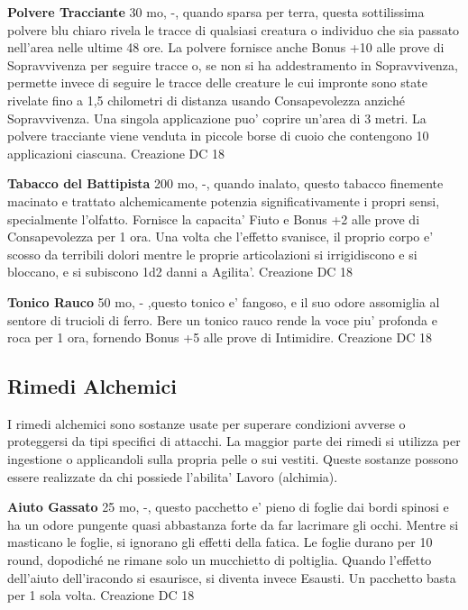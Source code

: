 \documentclass[a4paper,11pt,twoside,openany]{book}
\begin{document}
{\textbf{Polvere Tracciante} 30 mo, -, quando sparsa per terra, questa sottilissima polvere blu chiaro rivela le tracce di qualsiasi creatura o individuo che sia passato nell'area nelle ultime 48 ore.
La polvere fornisce anche Bonus +10 alle prove di Sopravvivenza per seguire tracce o, se non si ha addestramento in Sopravvivenza, permette invece di seguire le tracce delle creature le cui impronte sono state rivelate fino a 1,5 chilometri di distanza usando Consapevolezza anziché Sopravvivenza. Una singola applicazione puo' coprire un'area di 3 metri. 
La polvere tracciante viene venduta in piccole borse di cuoio che contengono 10 applicazioni ciascuna. Creazione DC 18

\textbf{Tabacco del Battipista} 200 mo, -, quando inalato, questo tabacco finemente macinato e trattato alchemicamente potenzia significativamente i propri sensi, specialmente l'olfatto. Fornisce la capacita' Fiuto e Bonus +2 alle prove di Consapevolezza per 1 ora. Una volta che l'effetto svanisce, il proprio corpo e' scosso da terribili dolori mentre le proprie articolazioni si irrigidiscono e si bloccano, e si subiscono 1d2 danni a Agilita'. Creazione DC 18

\textbf{Tonico Rauco} 50 mo, - ,questo tonico e' fangoso, e il suo odore assomiglia al sentore di trucioli di ferro. Bere un tonico rauco rende la voce piu' profonda e roca per 1 ora, fornendo Bonus +5 alle prove di Intimidire. Creazione DC 18

\subsection{Rimedi Alchemici}

\label{rimedi-alchemici}

I rimedi alchemici sono sostanze usate per superare condizioni avverse o proteggersi da tipi specifici di attacchi. La maggior parte dei rimedi si utilizza per ingestione o applicandoli sulla propria pelle o sui vestiti. Queste sostanze possono essere realizzate da chi possiede l'abilita' Lavoro (alchimia).

\textbf{Aiuto Gassato} 25 mo, -, questo pacchetto e' pieno di foglie dai bordi spinosi e ha un odore pungente quasi abbastanza forte da far lacrimare gli occhi. Mentre si masticano le foglie, si ignorano gli effetti della fatica. Le foglie durano per 10 round, dopodiché ne rimane solo un mucchietto di poltiglia.
Quando l'effetto dell'aiuto dell'iracondo si esaurisce, si diventa invece Esausti. Un pacchetto basta per 1 sola volta. Creazione DC 18

}
\end{document}
